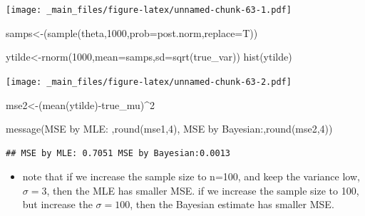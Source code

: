 \documentclass[
]{book}
\newenvironment{Shaded}{\begin{snugshade}}{\end{snugshade}}
\newcommand{\AttributeTok}[1]{\textcolor[rgb]{0.77,0.63,0.00}{#1}}
\newcommand{\DecValTok}[1]{\textcolor[rgb]{0.00,0.00,0.81}{#1}}
\newcommand{\FunctionTok}[1]{\textcolor[rgb]{0.00,0.00,0.00}{#1}}
\newcommand{\NormalTok}[1]{#1}
\newcommand{\OtherTok}[1]{\textcolor[rgb]{0.56,0.35,0.01}{#1}}
\newcommand{\SpecialCharTok}[1]{\textcolor[rgb]{0.00,0.00,0.00}{#1}}
\newcommand{\StringTok}[1]{\textcolor[rgb]{0.31,0.60,0.02}{#1}}
\providecommand{\tightlist}{%
  \setlength{\itemsep}{0pt}\setlength{\parskip}{0pt}}
\theoremstyle{definition}
\theoremstyle{definition}
\theoremstyle{definition}
\theoremstyle{definition}
\theoremstyle{remark}
\begin{document}
\texttt{[image: \_main\_files/figure-latex/unnamed-chunk-63-1.pdf]}

\begin{Shaded}
\begin{Highlighting}[]
\NormalTok{ samps}\OtherTok{\textless{}{-}}\NormalTok{(}\FunctionTok{sample}\NormalTok{(theta,}\DecValTok{1000}\NormalTok{,}\AttributeTok{prob=}\NormalTok{post.norm,}\AttributeTok{replace=}\NormalTok{T))}
  
\NormalTok{ytilde}\OtherTok{\textless{}{-}}\FunctionTok{rnorm}\NormalTok{(}\DecValTok{1000}\NormalTok{,}\AttributeTok{mean=}\NormalTok{samps,}\AttributeTok{sd=}\FunctionTok{sqrt}\NormalTok{(true\_var)) }
 \FunctionTok{hist}\NormalTok{(ytilde)}
\end{Highlighting}
\end{Shaded}

\texttt{[image: \_main\_files/figure-latex/unnamed-chunk-63-2.pdf]}

\begin{Shaded}
\begin{Highlighting}[]
\NormalTok{ mse2}\OtherTok{\textless{}{-}}\NormalTok{(}\FunctionTok{mean}\NormalTok{(ytilde)}\SpecialCharTok{{-}}\NormalTok{true\_mu)}\SpecialCharTok{\^{}}\DecValTok{2}
 
 
 \FunctionTok{message}\NormalTok{(}\StringTok{\textquotesingle{}MSE by MLE: \textquotesingle{}}\NormalTok{,}\FunctionTok{round}\NormalTok{(mse1,}\DecValTok{4}\NormalTok{),}\StringTok{\textquotesingle{} MSE by Bayesian:\textquotesingle{}}\NormalTok{,}\FunctionTok{round}\NormalTok{(mse2,}\DecValTok{4}\NormalTok{))}
\end{Highlighting}
\end{Shaded}

\begin{verbatim}
## MSE by MLE: 0.7051 MSE by Bayesian:0.0013
\end{verbatim}

\begin{itemize}
\tightlist
\item
  note that if we increase the sample size to n=100, and keep the variance low, \(\sigma=3\), then the MLE has smaller MSE. if we increase the sample size to 100, but increase the \(\sigma=100\), then the Bayesian estimate has smaller MSE.
\end{itemize}
\end{document}
